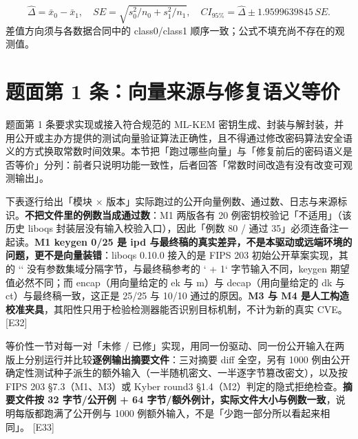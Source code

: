 \documentclass[UTF8,fontset=fandol,11pt,a4paper]{ctexart}
\begin{document}
\[\widehat\Delta=\bar x_0-\bar x_1,\quad SE=\sqrt{s_0^2/n_0+s_1^2/n_1},\quad CI_{95\%}=\widehat\Delta\pm1.9599639845\,SE.\]
\noindent 差值方向须与各数据合同中的 class0/class1 顺序一致；公式不填充尚不存在的观测值。
\section{题面第 1 条：向量来源与修复语义等价}
题面第 1 条要求实现或接入符合规范的 ML-KEM 密钥生成、封装与解封装，并用公开或主办方提供的测试向量验证算法正确性，且不得通过修改密码算法安全语义的方式换取常数时间效果。本节把「跑过哪些向量」与「修复前后的密码语义是否等价」分列：前者只说明功能一致性，后者回答「常数时间改造有没有改变可观测输出」。


下表逐行给出「模块 \texorpdfstring{$\times$}{x} 版本」实际跑过的公开向量例数、通过数、日志与来源标识。\textbf{不把文件里的例数当成通过数}：M1 两版各有 20 例密钥校验记「不适用」（该历史 liboqs 封装层没有输入校验入口），因此「例数 80 / 通过 35」必须连备注一起读。\textbf{M1 keygen 0/25 是 ipd 与最终稿的真实差异，不是本驱动或远端环境的问题，更不是向量装错}：liboqs 0.10.0 接入的是 FIPS 203 初始公开草案实现，其 \texttt{} 的 `\texttt{}` 没有参数集域分隔字节，与最终稿参考的 `\texttt{} + 1` 字节输入不同，keygen 期望值必然不同；而 encap（用向量给定的 ek 与 m）与 decap（用向量给定的 dk 与 ct）与最终稿一致，这正是 25/25 与 10/10 通过的原因。\textbf{M3 与 M4 是人工构造校准夹具}，其阳性只用于检验检测器能否识别目标机制，不计为新的真实 CVE。 [E32]


等价性一节对每一对「未修 / 已修」实现，用同一份驱动、同一份公开输入在两版上分别运行并比较\textbf{逐例输出摘要文件}：三对摘要 diff 全空，另有 1000 例由公开确定性测试种子派生的额外输入（一半随机密文、一半逐字节篡改密文），以及按 FIPS 203 §7.3（M1、M3）或 Kyber round3 §1.4（M2）判定的隐式拒绝检查。\textbf{摘要文件按 32 字节/公开例 + 64 字节/额外例计，实际文件大小与例数一致}，说明每版都跑满了公开例与 1000 例额外输入，不是「少跑一部分所以看起来相同」。 [E33]
\end{document}

